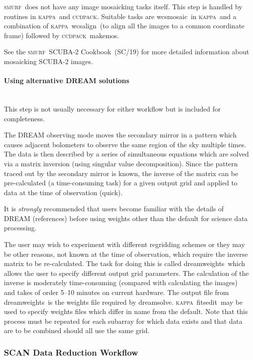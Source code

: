 \documentclass[twoside,11pt]{article}
\newcommand{\xref}[3]{#1}
\newcommand{\xlabel}[1]{}
\renewcommand{\_}{\texttt{\symbol{95}}}
\newcommand{\CCDPACK}{\textsc{ccdpack}}
\newcommand{\KAPPA}{\textsc{kappa}}
\newcommand{\SMURF}{\textsc{smurf}}
\newcommand{\SMURFcook}{\xref{\SMURF\ SCUBA-2 Cookbook}{sc19}{}}
\newcommand{\task}[1]{\textsf{#1}}
\newcommand{\dreamsolve}{\xref{\task{dreamsolve}}{sun258}{DREAMSOLVE}}
\newcommand{\dreamweights}{\xref{\task{dreamweights}}{sun258}{DREAMWEIGHTS}}
\newcommand{\makemos}{\xref{\task{makemos}}{sun139}{MAKEMOS}}
\newcommand{\fitsedit}{\xref{\task{fitsedit}}{sun95}{FITSEDIT}}
\newcommand{\wcsmosaic}{\xref{\task{wcsmosaic}}{sun95}{WCSMOSAIC}}
\newcommand{\wcsalign}{\xref{\task{wcsalign}}{sun95}{WCSALIGN}}
\begin{document}
\SMURF\ does not have any image mosaicking tasks itself. This step is
handled by routines in \KAPPA\ and \CCDPACK. Suitable tasks are
\wcsmosaic\ in \KAPPA\ and a combination of \KAPPA\ \wcsalign\ (to
align all the images to a common coordinate frame) followed by
\CCDPACK\ \makemos.

See the \SMURFcook\ (SC/19) for more detailed information about
mosaicking SCUBA-2 images.

\paragraph{\xlabel{dream}Using alternative DREAM solutions\label{se:dream}} \ \\

This step is not usually necessary for either workflow but is included
for completeness.

The DREAM observing mode moves the secondary mirror in a pattern which
causes adjacent bolometers to observe the same region of the sky
multiple times. The data is then described by a series of simultaneous
equations which are solved via a matrix inversion (using singular
value decomposition). Since the pattern traced out by the secondary
mirror is known, the inverse of the matrix can be pre-calculated (a
time-consuming task) for a given output grid and applied to data at
the time of observation (quick).

It is {\em strongly} recommended that users become familiar with the
details of DREAM (references) before using weights other than the
default for science data processing.

The user may wish to experiment with different regridding schemes or
they may be other reasons, not known at the time of observation, which
require the inverse matrix to be re-calculated. The task for doing
this is called \dreamweights\ which allows the user to specify
different output grid parameters. The calculation of the inverse is
moderately time-consuming (compared with calculating the images) and
takes of order 5--10 minutes on current hardware. The output file from
\dreamweights\ is the weights file required by \dreamsolve. \KAPPA\
\fitsedit\ may be used to specify weights files which differ in name
from the default. Note that this process must be repeated for each
subarray for which data exists and that data are to be combined should
all use the same grid.

\subsubsection{\xlabel{scanworkflow}SCAN Data Reduction Workflow\label{se:scanworkflow}}
\end{document}
